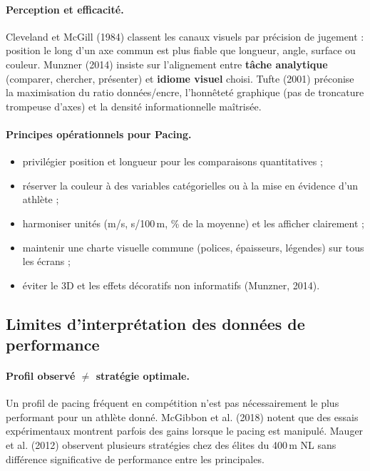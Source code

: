 \documentclass[11pt,a4paper]{article}
\begin{document}
\paragraph{Perception et efficacité.}
Cleveland et McGill (1984) classent les canaux visuels par précision de jugement : position le long d'un axe commun est plus fiable que longueur, angle, surface ou couleur. Munzner (2014) insiste sur l'alignement entre \textbf{tâche analytique} (comparer, chercher, présenter) et \textbf{idiome visuel} choisi. Tufte (2001) préconise la maximisation du ratio données/encre, l'honnêteté graphique (pas de troncature trompeuse d'axes) et la densité informationnelle maîtrisée.

\paragraph{Principes opérationnels pour Pacing.}
\begin{itemize}[leftmargin=*]
    \item privilégier position et longueur pour les comparaisons quantitatives ;
    \item réserver la couleur à des variables catégorielles ou à la mise en évidence d'un athlète ;
    \item harmoniser unités (m/s, s/100\,m, \% de la moyenne) et les afficher clairement ;
    \item maintenir une charte visuelle commune (polices, épaisseurs, légendes) sur tous les écrans ;
    \item éviter le 3D et les effets décoratifs non informatifs (Munzner, 2014).
\end{itemize}

\subsection{Limites d'interprétation des données de performance}

\paragraph{Profil observé $\neq$ stratégie optimale.}
Un profil de pacing fréquent en compétition n'est pas nécessairement le plus performant pour un athlète donné. McGibbon et al. (2018) notent que des essais expérimentaux montrent parfois des gains lorsque le pacing est manipulé. Mauger et al. (2012) observent plusieurs stratégies chez des élites du 400\,m NL sans différence significative de performance entre les principales.
\end{document}
